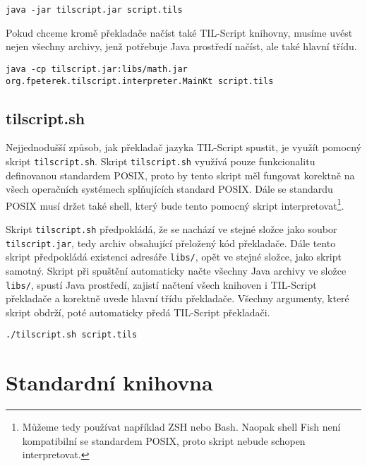 \begin{lstlisting}[caption={Spuštění překladače}]
java -jar tilscript.jar script.tils
\end{lstlisting}

Pokud chceme kromě překladače načíst také TIL-Script knihovny, musíme uvést nejen všechny archivy,
jenž potřebuje Java prostředí načíst, ale také hlavní třídu.

\begin{lstlisting}[caption={Spuštění překladače s načtením knihoven}]
java -cp tilscript.jar:libs/math.jar org.fpeterek.tilscript.interpreter.MainKt script.tils
\end{lstlisting}

\subsection{tilscript.sh}

Nejjednodušší způsob, jak překladač jazyka TIL-Script spustit, je využít pomocný skript
\lstinline{tilscript.sh}. Skript \lstinline{tilscript.sh} využívá pouze funkcionalitu definovanou
standardem POSIX, proto by tento skript měl fungovat korektně na všech operačních systémech
splňujících standard POSIX. Dále se standardu POSIX musí držet také shell, který bude tento pomocný
skript interpretovat\footnote{Můžeme tedy používat například ZSH nebo Bash. Naopak shell Fish není
kompatibilní se standardem POSIX, proto skript nebude schopen interpretovat.}.

Skript \lstinline{tilscript.sh} předpokládá, že se nachází ve stejné složce jako soubor
\lstinline{tilscript.jar}, tedy archiv obsahující přeložený kód překladače. Dále tento skript
předpokládá existenci adresáře \lstinline{libs/}, opět ve stejné složce, jako skript samotný.
Skript při spuštění automaticky načte všechny Java archivy ve složce \lstinline{libs/}, spustí
Java prostředí, zajistí načtení všech knihoven i TIL-Script překladače a korektně uvede hlavní
třídu překladače. Všechny argumenty, které skript obdrží, poté automaticky předá TIL-Script
překladači.

\begin{lstlisting}[caption={Spuštění překladače za využití pomocného skriptu}]
./tilscript.sh script.tils
\end{lstlisting}

\section{Standardní knihovna}\label{stdlib-doc}

